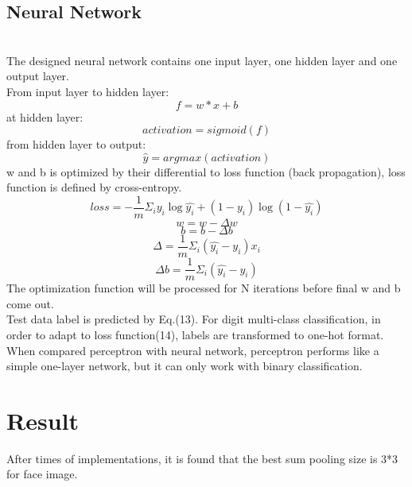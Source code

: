 \documentclass{article}
\begin{document}
\subsection{Neural Network}
\\The designed neural network contains one input layer, one hidden layer and one output layer. 
\\From input layer to hidden layer:
\begin{equation}
\label{eqn:somelabel}
f = w* x + b
\end{equation}
at hidden layer:
\begin{equation}
\label{eqn:somelabel}
activation = sigmoid(f)
\end{equation}
from hidden layer to output:
\begin{equation}
\label{eqn:somelabel}
\hat{y} = argmax(activation)
\end{equation}
w and b is optimized by their differential to loss function (back propagation), loss function is defined by cross-entropy.
\begin{equation}
\label{eqn:somelabel}
loss = -\frac{1}{m}\Sigma_i y_i \log{\hat{y_i}} +(1-y_i)\log{(1-\hat{y_i})}
\end{equation}
\begin{equation}
\label{eqn:somelabel}
w = w - \Delta w
\end{equation}
\begin{equation}
\label{eqn:somelabel}
b = b - \Delta b
\end{equation}
\begin{equation}
\label{eqn:somelabel}
\Delta = \frac{1}{m}\Sigma_i(\hat{y_i}-y_i)x_i
\end{equation}
\begin{equation}
\label{eqn:somelabel}
\Delta b = \frac{1}{m}\Sigma_i( \hat{y_i}-y_i)
\end{equation}
The optimization function will be processed for N iterations before final w and b come out.
\\Test data label is predicted by Eq.(13). For digit multi-class classification, in order to adapt to loss function(14), labels are transformed to one-hot format.
\\When compared perceptron with neural network, perceptron performs like a simple one-layer network, but it can only work with binary classification.

\clearpage
\section{Result}
After times of implementations, it is found that the best sum pooling size is 3*3 for face image.
\end{document}
